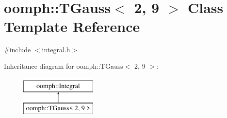 \hypertarget{classoomph_1_1TGauss_3_012_00_019_01_4}{}\section{oomph\+:\+:T\+Gauss$<$ 2, 9 $>$ Class Template Reference}
\label{classoomph_1_1TGauss_3_012_00_019_01_4}


{\ttfamily \#include $<$integral.\+h$>$}

Inheritance diagram for oomph\+:\+:T\+Gauss$<$ 2, 9 $>$\+:\begin{figure}[H]
\begin{center}
\leavevmode
\includegraphics[height=2.000000cm]{classoomph_1_1TGauss_3_012_00_019_01_4}
\end{center}
\end{figure}
